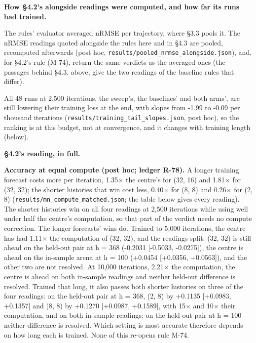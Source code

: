 \documentclass[10pt]{article}
\begin{document}
\textbf{How \S{}4.2's alongside readings were computed, and how far its runs had trained.}

The rules' evaluator averaged nRMSE per trajectory, where \S{}3.3 pools it. The nRMSE readings quoted alongside the rules here and in \S{}4.3 are pooled, recomputed afterwards (post hoc, \texttt{results/\allowbreak{}pooled\_\allowbreak{}nrmse\_\allowbreak{}alongside\allowbreak{}.json}), and, for \S{}4.2's rule (M-74), return the same verdicts as the averaged ones (the passages behind \S{}4.3, above, give the two readings of the baseline rules that differ).

All 48 runs at 2,500 iterations, the sweep's, the baselines' and both arms', are still lowering their training loss at the end, with slopes from -1.99 to -0.09 per thousand iterations (\texttt{results/\allowbreak{}training\_\allowbreak{}tail\_\allowbreak{}slopes\allowbreak{}.json}, post hoc), so the ranking is at this budget, not at convergence, and it changes with training length (below).

\textbf{\S{}4.2's reading, in full.}

\textbf{Accuracy at equal compute (post hoc; ledger R-78).} A longer training forecast costs more per iteration, 1.35$\times$ the centre's for (32, 16) and 1.81$\times$ for (32, 32); the shorter histories that win cost less, 0.40$\times$ for (8, 8) and 0.26$\times$ for (2, 8) (\texttt{results/\allowbreak{}mn\_\allowbreak{}compute\_\allowbreak{}matched\allowbreak{}.json}; the table below gives every reading). The shorter histories win on all four readings at 2,500 iterations while using well under half the centre's computation, so that part of the verdict needs no compute correction. The longer forecasts' wins do. Trained to 5,000 iterations, the centre has had 1.11$\times$ the computation of (32, 32), and the readings split: (32, 32) is still ahead on the held-out pair at h = 368 (-0.2031 [-0.5033, -0.0275]), the centre is ahead on the in-sample arena at h = 100 (+0.0454 [+0.0356, +0.0563]), and the other two are not resolved. At 10,000 iterations, 2.21$\times$ the computation, the centre is ahead on both in-sample readings and neither held-out difference is resolved. Trained that long, it also passes both shorter histories on three of the four readings: on the held-out pair at h = 368, (2, 8) by +0.1135 [+0.0983, +0.1357] and (8, 8) by +0.1270 [+0.0987, +0.1589], with 15$\times$ and 10$\times$ their computation, and on both in-sample readings; on the held-out pair at h = 100 neither difference is resolved. Which setting is most accurate therefore depends on how long each is trained. None of this re-opens rule M-74.
\end{document}
